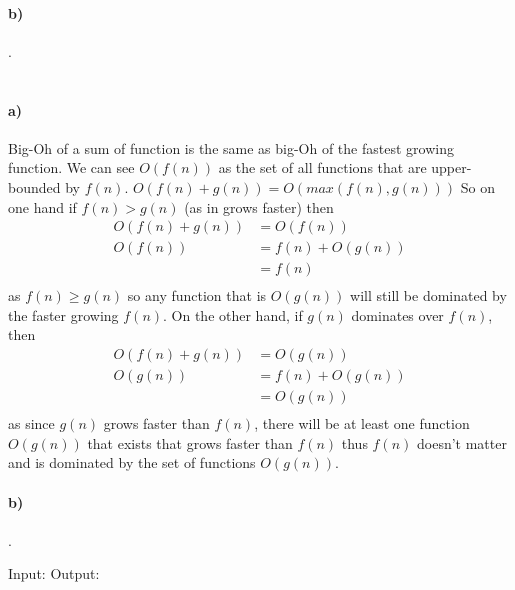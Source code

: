 \documentclass[11pt,letterpaper]{article}
\begin{document}
		\paragraph{b)}
		.
		
	\section{}
	
		\paragraph{a)}
		Big-Oh of a sum of function is the same as big-Oh of the fastest growing function. We can see $O(f(n))$ as the set of all functions that are upper-bounded by $f(n)$.
		$O(f(n)+g(n)) = O(max(f(n),g(n)))$
		So on one hand if $f(n) > g(n)$ (as in grows faster) then
		\begin{align*}
		O(f(n)+g(n)) &= O(f(n)) \\
		O(f(n)) &= f(n) + O(g(n)) \\
		& = f(n) \\
		\end{align*}
		as $f(n) \ge g(n)$ so any function that is $O(g(n))$ will still be dominated by the faster growing $f(n)$.
		On the other hand, if $g(n)$ dominates over $f(n)$, then
		\begin{align*}
		O(f(n)+g(n)) &= O(g(n)) \\
		O(g(n)) &= f(n) + O(g(n)) \\
		& = O(g(n)) \\
		\end{align*}
		as since $g(n)$ grows faster than $f(n)$, there will be at least one function $O(g(n))$ that exists that grows faster than $f(n)$ thus $f(n)$ doesn't matter and is dominated by the set of functions $O(g(n))$.
		
		\paragraph{b)}
		.
		
		\begin{algorithm}[caption={f()}, label={alg5}]
Input: 
Output: 


		\end{algorithm}
		
\end{document}
